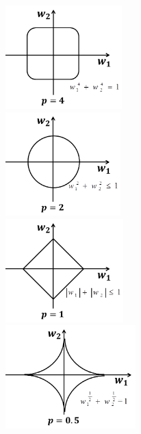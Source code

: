         \begin{figure}[H]
          \centering
          \begin{varwidth}[t]{\textwidth}
            \vspace{0pt}
            \includegraphics[height=4cm]{images/The_contour_of_regular_term1.jpg}
          \end{varwidth}
          \begin{varwidth}[t]{\textwidth}
            \vspace{0pt}
            \includegraphics[height=4cm]{images/The_contour_of_regular_term2.jpg}
          \end{varwidth}
          \begin{varwidth}[t]{\textwidth}
            \vspace{0pt}
            \includegraphics[height=4cm]{images/The_contour_of_regular_term3.jpg}
          \end{varwidth}
            \begin{varwidth}[t]{\textwidth}
            \vspace{0pt}
            \includegraphics[height=4cm]{images/The_contour_of_regular_term4.jpg}

\end{varwidth}
\end{figure}
